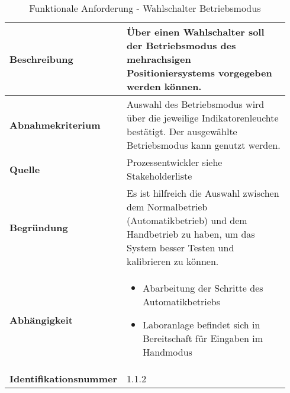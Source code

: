 \documentclass[../Bachelorarbeit.tex]{subfiles}
\begin{document}
\begin{table}[H]
    \centering
    \begin{tabular}{| p{0.34\linewidth} | p{0.6\linewidth} |}
        \hline
        \textbf{Beschreibung} & Über einen Wahlschalter soll der Betriebsmodus des mehrachsigen Positioniersystems vorgegeben werden können. \\ \hline
        \textbf{Abnahmekriterium} & Auswahl des Betriebsmodus wird über die jeweilige Indikatorenleuchte bestätigt. Der ausgewählte Betriebsmodus kann genutzt werden. \\ \hline
        \textbf{Quelle} & Prozessentwickler siehe Stakeholderliste \\ \hline
        \textbf{Begründung} & Es ist hilfreich die Auswahl zwischen dem Normalbetrieb (Automatikbetrieb) und dem Handbetrieb zu haben, um das System besser Testen und kalibrieren zu können. \\ \hline
        \textbf{Abhängigkeit} & {\begin{itemize}[noitemsep,topsep=0pt,parsep=0pt,partopsep=0pt,leftmargin=*]
            \item Abarbeitung der Schritte des Automatikbetriebs
            \item Laboranlage befindet sich in Bereitschaft für Eingaben im Handmodus
        \end{itemize}} \\ \hline
        \textbf{Identifikationsnummer} & 1.1.2 \\ \hline
    \end{tabular}
    \caption[\acs{fa} - Wahlschalter Betriebsmodus]{Funktionale Anforderung - Wahlschalter Betriebsmodus}
    \label{tab:my-table2}
\end{table}
\end{document}

